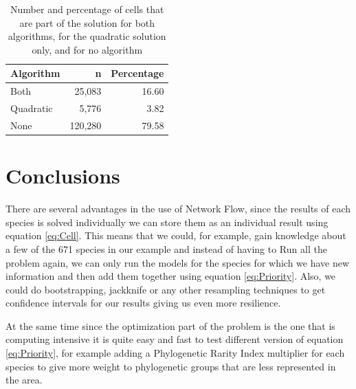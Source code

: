 \documentclass[]{article}
\begin{document}
\begin{table}[!h]

\caption{\label{tab:Pers}Number and percentage of cells that are part of the solution for both algorithms, for the quadratic solution only, and for no algorithm}
\centering
\begin{tabular}[t]{lrr}
\toprule
Algorithm & n & Percentage\\
\midrule
\rowcolor{gray!6}  Both & 25,083 & 16.60\\
Quadratic & 5,776 & 3.82\\
\rowcolor{gray!6}  None & 120,280 & 79.58\\
\bottomrule
\end{tabular}
\end{table}

\hypertarget{conclusions}{%
\section{Conclusions}\label{conclusions}}

There are several advantages in the use of Network Flow, since the results of each species is solved individually we can store them as an individual result using equation \eqref{eq:Cell}. This means that we could, for example, gain knowledge about a few of the 671 species in our example and instead of having to Run all the problem again, we can only run the models for the species for which we have new information and then add them together using equation \eqref{eq:Priority}. Also, we could do bootstrapping, jackknife or any other resampling techniques to get confidence intervals for our results giving us even more resilience.

At the same time since the optimization part of the problem is the one that is computing intensive it is quite easy and fast to test different version of equation \eqref{eq:Priority}, for example adding a Phylogenetic Rarity Index multiplier for each species to give more weight to phylogenetic groups that are less represented in the area.
\end{document}
